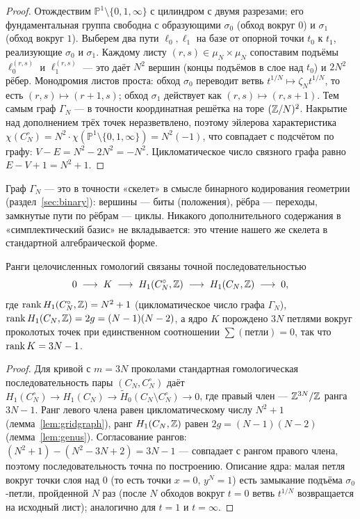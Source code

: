 \begin{proof}
Отождествим $\mathbb{P}^1\setminus\{0,1,\infty\}$ с цилиндром с двумя
разрезами; его фундаментальная группа свободна с образующими
$\sigma_0$ (обход вокруг $0$) и $\sigma_1$ (обход вокруг $1$).
Выберем два пути $\ell_0,\ell_1$ на базе от опорной точки $t_0$ к
$t_1$, реализующие $\sigma_0$ и $\sigma_1$. Каждому листу
$(r,s)\in\mu_N\times\mu_N$ сопоставим подъёмы $\ell_0^{(r,s)}$ и
$\ell_1^{(r,s)}$ --- это даёт $N^2$ вершин (концы подъёмов в слое над
$t_0$) и $2N^2$ рёбер. Монодромия листов проста: обход $\sigma_0$
переводит ветвь $t^{1/N}\mapsto\zeta_N t^{1/N}$, то есть
$(r,s)\mapsto(r+1,s)$; обход $\sigma_1$ действует как
$(r,s)\mapsto(r,s+1)$. Тем самым граф $\Gamma_N$ --- в точности
координатная решётка на торе $(\mathbb{Z}/N)^2$. Накрытие над дополнением
трёх точек неразветвлено, поэтому эйлерова характеристика
$\chi(C_N^\circ)=N^2\cdot\chi(\mathbb{P}^1\setminus\{0,1,\infty\})
=N^2(-1)$, что совпадает с подсчётом по графу:
$V-E=N^2-2N^2=-N^2$. Цикломатическое число связного графа равно
$E-V+1=N^2+1$.
\end{proof}

\begin{remark}
Граф $\Gamma_N$ --- это в точности «скелет» в смысле бинарного
кодирования геометрии (раздел~\ref{sec:binary}): вершины --- биты
(положения), рёбра --- переходы, замкнутые пути по рёбрам --- циклы.
Никакого дополнительного содержания в «симплектический базис» не
вкладывается: это чтение нашего же скелета в стандартной
алгебраической форме.
\end{remark}

\begin{lemma}\label{lem:capping}
Ранги целочисленных гомологий связаны точной последовательностью
\[
  0\;\longrightarrow\; K\;\longrightarrow\;
  H_1(C_N^\circ,\mathbb{Z})\;\longrightarrow\;H_1(C_N,\mathbb{Z})\;\longrightarrow\;0,
\]
где $\operatorname{rank} H_1(C_N^\circ,\mathbb{Z})=N^2+1$ (цикломатическое число графа
$\Gamma_N$), $\operatorname{rank} H_1(C_N,\mathbb{Z})=2g=(N-1)(N-2)$, а ядро $K$ порождено
$3N$ петлями вокруг проколотых точек при единственном соотношении
$\sum(\text{петли})=0$, так что $\operatorname{rank} K=3N-1$.
\end{lemma}

\begin{proof}
Для кривой с $m=3N$ проколами стандартная гомологическая
последовательность пары $(C_N,C_N^\circ)$ даёт
$H_1(C_N^\circ)\to H_1(C_N)\to\widetilde H_0(C_N\setminus C_N^\circ)
\to 0$, где правый член --- $\mathbb{Z}^{3N}/\mathbb{Z}$ ранга $3N-1$. Ранг левого
члена равен цикломатическому числу $N^2+1$ (лемма~\ref{lem:gridgraph}),
ранг $H_1(C_N,\mathbb{Z})$ равен $2g=(N-1)(N-2)$ (лемма~\ref{lem:genus}).
Согласование рангов: $(N^2+1)-(N^2-3N+2)=3N-1$ --- совпадает с рангом
правого члена, поэтому последовательность точна по построению.
Описание ядра: малая петля вокруг точки слоя над $0$ (то есть точки
$x=0$, $y^N=1$) есть замыкание подъёма $\sigma_0$-петли, пройденной
$N$ раз (после $N$ обходов вокруг $t=0$ ветвь $t^{1/N}$ возвращается
на исходный лист); аналогично для $t=1$ и $t=\infty$.
\end{proof}

